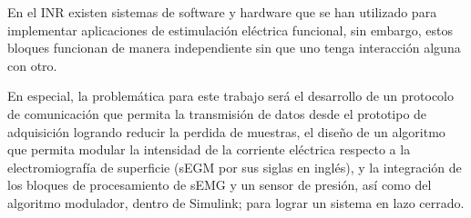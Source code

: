 
En el INR existen sistemas de software y hardware que se han utilizado para implementar aplicaciones de estimulación eléctrica funcional, sin embargo, estos bloques funcionan de manera independiente sin que uno tenga interacción alguna con otro.

En especial, la problemática para este trabajo será el desarrollo de un protocolo de comunicación que permita la transmisión de datos desde el prototipo de adquisición logrando reducir la perdida de muestras, el diseño de un algoritmo que permita modular la intensidad de la corriente eléctrica respecto a la electromiografía de superficie (sEGM por sus siglas en inglés), y la integración de los bloques de procesamiento de sEMG y un sensor de presión, así como del algoritmo modulador, dentro de Simulink; para lograr un sistema en lazo cerrado.